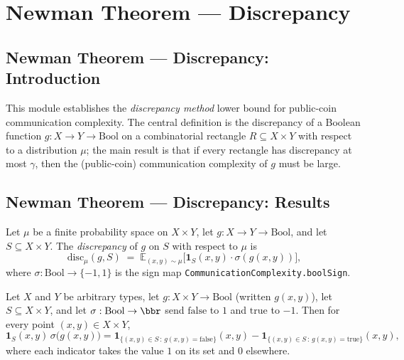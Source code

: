 \section{Newman Theorem --- Discrepancy}
\subsection*{Newman Theorem --- Discrepancy: Introduction}

This module establishes the \emph{discrepancy method} lower bound for public-coin
communication complexity.  The central definition is the discrepancy of a Boolean
function $g : X \to Y \to \mathrm{Bool}$ on a combinatorial rectangle $R \subseteq X
\times Y$ with respect to a distribution $\mu$; the main result is that if every
rectangle has discrepancy at most $\gamma$, then the (public-coin) communication
complexity of $g$ must be large.

\subsection*{Newman Theorem --- Discrepancy: Results}

\begin{definition}
\label{CommunicationComplexity.discrepancy}
\leanok
{}
Let $\mu$ be a finite probability space on $X \times Y$, let $g : X \to Y \to
\mathrm{Bool}$, and let $S \subseteq X \times Y$.  The \emph{discrepancy} of $g$ on $S$
with respect to $\mu$ is
\[
  \mathrm{disc}_\mu(g, S)
  \;=\;
  \mathbb{E}_{(x,y)\sim\mu}\bigl[\mathbf{1}_{S}(x,y)\cdot\sigma(g(x,y))\bigr],
\]
where $\sigma : \mathrm{Bool} \to \{-1,1\}$ is the sign map \texttt{CommunicationComplexity.boolSign}.
\end{definition}

\begin{lemma}
\label{CommunicationComplexity.discrepancy_integrand_eq}
\leanok
{}
Let $X$ and $Y$ be arbitrary types, let $g : X \times Y \to \mathrm{Bool}$ (written
$g(x,y)$), let $S \subseteq X \times Y$, and let $\sigma : \mathrm{Bool} \to \bbr$ send
$\mathrm{false}$ to $1$ and $\mathrm{true}$ to $-1$. Then for every point $(x,y) \in X
\times Y$,
\[
\mathbf{1}_{S}(x,y)\,\sigma\bigl(g(x,y)\bigr)
= \mathbf{1}_{\{(x,y)\in S \,:\, g(x,y)=\mathrm{false}\}}(x,y)
- \mathbf{1}_{\{(x,y)\in S \,:\, g(x,y)=\mathrm{true}\}}(x,y),
\]
where each indicator takes the value $1$ on its set and $0$ elsewhere.
\end{lemma}

